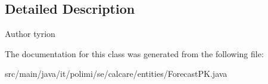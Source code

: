 \subsection{Detailed Description}
\begin{DoxyAuthor}{Author}
tyrion 
\end{DoxyAuthor}


The documentation for this class was generated from the following file\+:\begin{DoxyCompactItemize}
\item 
src/main/java/it/polimi/se/calcare/entities/Forecast\+P\+K.\+java\end{DoxyCompactItemize}
